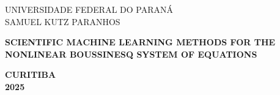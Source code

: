 

\AddToShipoutPicture*{\BackgroundPic}

\clearpage
\thispagestyle{empty}

\begin{bfseries}
\begin{center}

\vspace{0.5cm} 
UNIVERSIDADE FEDERAL DO PARANÁ \\

\vspace{0.6cm}
SAMUEL KUTZ PARANHOS \\
\vspace{2.5cm}

\vspace*{1cm}
\textbf{\MakeUppercase{Scientific Machine Learning Methods for the \\ Nonlinear Boussinesq System of Equations}} \\

\begin{minipage}[t]{0.45\textwidth} \hspace{2cm}
\raggedright
\end{minipage}
\begin{minipage}[t]{0.5\textwidth}\hspace{2cm}
\raggedright
\vspace*{3cm}
\begin{flushleft}
\footnotesize  
\justify
\hspace{-0,35cm}
\textnormal{}
\end{flushleft}
\end{minipage}

\vspace*{3cm}
\textbf{\MakeUppercase{CURITIBA}} \\
\textbf{\MakeUppercase{\textnormal{2025}}}
\end{center}
\end{bfseries}

\pagebreak
